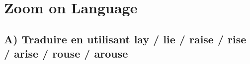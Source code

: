 \documentclass[a4paper,english,bookmarks]{article}
\begin{document}
\newboxans

\newcommand{\wordcount}[1]{\reversemarginpar\marginnote{\color{white5}#1}\normalmarginpar}

\hfill\newline

\section*{\centering\EBGaramond\Large Zoom on Language}

\subsection*{A) Traduire en utilisant lay / lie / raise / rise / arise / rouse / arouse}
\end{document}
